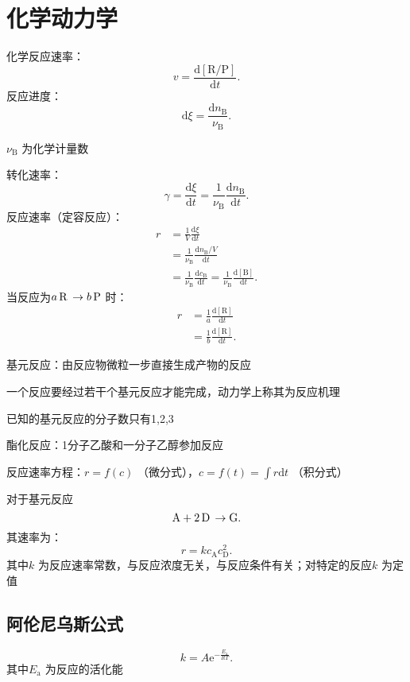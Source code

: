 \section{化学动力学}%
\label{sec:化学动力学}
化学反应速率：
\[
    v = \frac{\mathrm{d}[\text{R/P}]}{\mathrm{d}t}
.\]
反应进度：
\[
    \mathrm{d}\xi = \frac{\mathrm{d}n_\text{B}}{\nu_\text{B}}
.\]
\begin{notation}
    $\nu_\text{B}$ 为化学计量数
\end{notation}
转化速率：
\[
    \gamma = \frac{\mathrm{d}\xi}{\mathrm{d}t} = \frac{1}{\nu_\text{B}}\frac{\mathrm{d}n_\text{B}}{\mathrm{d}t}
.\]
反应速率（定容反应）：
\begin{align*}
    r &= \frac{1}{V}\frac{\mathrm{d}\xi}{\mathrm{d}t} \\
    &= \frac{1}{\nu_\text{B}}\frac{\mathrm{d}n_\text{B} / V}{\mathrm{d}t} \\
    &= \frac{1}{\nu_\text{B}}\frac{\mathrm{d}c_\text{B}}{\mathrm{d}t} = \frac{1}{\nu_\text{B}}\frac{\mathrm{d}[\text{B}]}{\mathrm{d}t}
.\end{align*}
当反应为$\ce{a R \to b P}$ 时：
\begin{align*}
    r &= \frac{1}{a}\frac{\mathrm{d}[\text{R}]}{\mathrm{d}t} \\
      &= \frac{1}{b}\frac{\mathrm{d}[\text{R}]}{\mathrm{d}t}
.\end{align*}
\begin{defi}
    基元反应：由反应物微粒一步直接生成产物的反应

    一个反应要经过若干个基元反应才能完成，动力学上称其为反应机理
\end{defi}
    已知的基元反应的分子数只有1,2,3
\begin{eg}
    酯化反应：1分子乙酸和一分子乙醇参加反应
\end{eg}
反应速率方程：$r = f\left( c \right)$ （微分式），$c = f\left( t \right) = \int r \mathrm{d}t$ （积分式）
\begin{notation}
    对于基元反应\[
        \ce{A + 2D \to G}
    .\]
    其速率为：
    \[
        r = kc_\text{A}c_\text{D}^2 
    .\]
    其中$k$ 为反应速率常数，与反应浓度无关，与反应条件有关；对特定的反应$k$ 为定值
\end{notation}
\subsection{阿伦尼乌斯公式}%
\label{sub:阿伦尼乌斯公式}
\[
    k = A\mathrm{e}^{-\frac{E_\text{a}}{RT}}
.\]
其中$E_\text{a}$ 为反应的活化能
